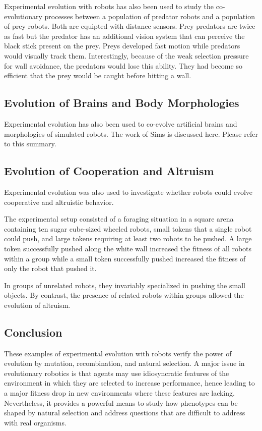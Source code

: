 \documentclass[../main.tex]{subfiles}
\begin{document}
\begin{experiment}
Experimental evolution with robots has also been used to study the co-evolutionary processes between a population of
predator robots and a population of prey robots. Both are equipted with distance sensors. Prey predators are twice as
fast but the predator has an additional vision system that can perceive the black stick present on the prey. Preys
developed fast motion while predators would visually track them. Interestingly, because of the weak selection pressure
for wall avoidance, the predators would lose this ability. They had become so efficient that the prey would be caught
before hitting a wall.
\end{experiment}

\subsection{Evolution of Brains and Body Morphologies}
Experimental evolution has also been used to co-evolve artificial brains and morphologies of simulated robots. The work
of Sims \cite{Sims:1994:EMB:1667943.1667946} is discussed here. Please refer to this summary.

\subsection{Evolution of Cooperation and Altruism}
Experimental evolution was also used to investigate whether robots could evolve cooperative and altruistic behavior.

\begin{experiment}
The experimental setup consisted of a foraging situation in a square arena containing ten sugar cube-sized wheeled
robots, small tokens that a single robot could push, and large tokens requiring at least two robots to be pushed. A
large token successfully pushed along the white wall increased the fitness of all robots within a group while a small
token successfully pushed increased the fitness of only the robot that pushed it.

In groups of unrelated robots, they invariably specialized in pushing the small objects. By contrast, the presence of
related robots within groups allowed the evolution of altruism.
\end{experiment}

\subsection{Conclusion}
These examples of experimental evolution with robots verify the power of evolution by mutation, recombination, and
natural selection. A major issue in evolutionary robotics is that agents may use idiosyncratic features of the
environment in which they are selected to increase performance, hence leading to a major fitness drop in new
environments where these features are lacking. Nevertheless, it provides a powerful means to study how phenotypes can
be shaped by natural selection and address questions that are difficult to address with real organisms.
\end{document}
